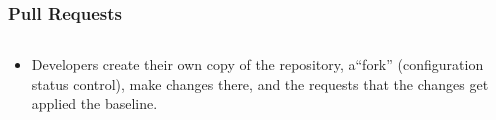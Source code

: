 \documentclass[12pt]{beamer}
\begin{document}
\begin{frame}
\frametitle{Pull Requests}

\begin{columns}
\begin{column}{0.5\textwidth}
    \begin{itemize}
    \item{Developers create their own copy of the repository, a``fork''
    (\alert{configuration status control}), make changes there, and the requests
    that the changes get applied the baseline.}
    \end{itemize}
\end{column}
\begin{column}{0.5\textwidth}

\end{column}
\end{columns}
\end{frame}
\end{document}
